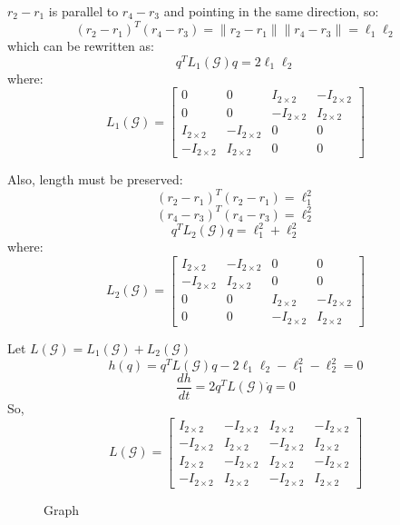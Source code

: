 \documentclass[conference]{IEEEtran}
\begin{document}
$r_2-r_1$ is parallel to $r_4-r_3$ and pointing in the same direction, so:
$$(r_2-r_1)^T(r_4-r_3)=\|r_2-r_1\|\|r_4-r_3\|=\ell_1\ell_2$$
which can be rewritten as:
$$q^TL_1(\mathcal{G})q=2\ell_1\ell_2$$
where:
$$L_1(\mathcal{G})=\begin{bmatrix}
    0 & 0 & I_{2\times2} & -I_{2\times2}\\
    0 & 0 & -I_{2\times2} & I_{2\times2}\\
    I_{2\times2} & -I_{2\times2} & 0 & 0\\
    -I_{2\times2} & I_{2\times2} & 0 & 0
\end{bmatrix}$$

Also, length must be preserved:
$$(r_2-r_1)^T(r_2-r_1)=\ell_1^2$$
$$(r_4-r_3)^T(r_4-r_3)=\ell_2^2$$
$$q^TL_2(\mathcal{G})q=\ell_1^2+\ell_2^2$$
where:
$$L_2(\mathcal{G})=\begin{bmatrix}
    I_{2\times2} & -I_{2\times2} & 0 & 0\\
    -I_{2\times2} & I_{2\times2} & 0 & 0\\
    0 & 0 & I_{2\times2} & -I_{2\times2}\\
    0 & 0 & -I_{2\times2} & I_{2\times2}
\end{bmatrix}$$

Let $L(\mathcal{G})=L_1(\mathcal{G})+L_2(\mathcal{G})$
$$h(q)=q^TL(\mathcal{G})q-2\ell_1\ell_2-\ell_1^2-\ell_2^2=0$$
$$\frac{dh}{dt}=2q^TL(\mathcal{G})\dot{q}=0$$
So,
$$L(\mathcal{G})=\begin{bmatrix}
    I_{2\times2} & -I_{2\times2} & I_{2\times2} & -I_{2\times2}\\
    -I_{2\times2} & I_{2\times2} & -I_{2\times2} & I_{2\times2}\\
    I_{2\times2} & -I_{2\times2} & I_{2\times2} & -I_{2\times2}\\
    -I_{2\times2} & I_{2\times2} & -I_{2\times2} & I_{2\times2}
\end{bmatrix}$$

\begin{figure}[htbp]
    \centering
    \caption{Graph}
    \label{ting3}
\end{figure}
\end{document}

